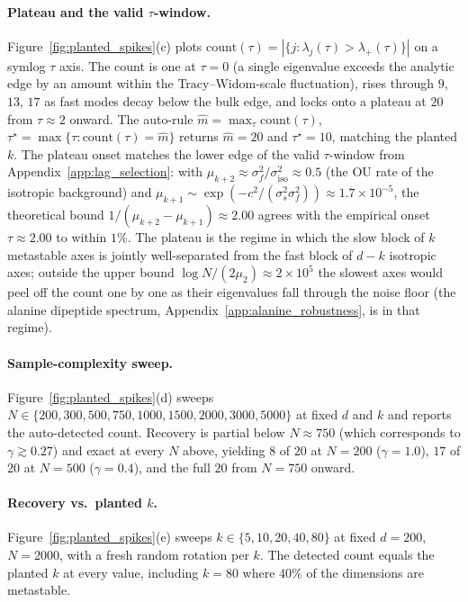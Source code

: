 \documentclass{article}
\begin{document}
\paragraph{Plateau and the valid $\tau$-window.}
Figure~\ref{fig:planted_spikes}(c) plots $\mathrm{count}(\tau) = |\{j: \lambda_j(\tau) > \lambda_+(\tau)\}|$ on a symlog $\tau$ axis. The count is one at $\tau = 0$ (a single eigenvalue exceeds the analytic edge by an amount within the Tracy--Widom-scale fluctuation), rises through $9$, $13$, $17$ as fast modes decay below the bulk edge, and locks onto a plateau at $20$ from $\tau \approx 2$ onward. The auto-rule $\hat m = \max_\tau \mathrm{count}(\tau)$, $\tau^\star = \max\{\tau : \mathrm{count}(\tau) = \hat m\}$ returns $\hat m = 20$ and $\tau^\star = 10$, matching the planted $k$. The plateau onset matches the lower edge of the valid $\tau$-window from Appendix~\ref{app:lag_selection}: with $\mu_{k+2} \approx \sigma_f^2/\sigma_{\mathrm{iso}}^2 \approx 0.5$ (the OU rate of the isotropic background) and $\mu_{k+1} \sim \exp(-c^2/(\sigma_s^2 \sigma_f^2)) \approx 1.7 \times 10^{-5}$, the theoretical bound $1/(\mu_{k+2} - \mu_{k+1}) \approx 2.00$ agrees with the empirical onset $\tau \approx 2.00$ to within $1\%$. The plateau is the regime in which the slow block of $k$ metastable axes is jointly well-separated from the fast block of $d-k$ isotropic axes; outside the upper bound $\log N / (2 \mu_2) \approx 2 \times 10^5$ the slowest axes would peel off the count one by one as their eigenvalues fall through the noise floor (the alanine dipeptide spectrum, Appendix~\ref{app:alanine_robustness}, is in that regime).

\paragraph{Sample-complexity sweep.}
Figure~\ref{fig:planted_spikes}(d) sweeps $N \in \{200, 300, 500, 750, 1000, 1500, 2000, 3000, 5000\}$ at fixed $d$ and $k$ and reports the auto-detected count. Recovery is partial below $N \approx 750$ (which corresponds to $\gamma \gtrsim 0.27$) and exact at every $N$ above, yielding $8$ of $20$ at $N = 200$ ($\gamma = 1.0$), $17$ of $20$ at $N = 500$ ($\gamma = 0.4$), and the full $20$ from $N = 750$ onward.

\paragraph{Recovery vs.\ planted $k$.}
Figure~\ref{fig:planted_spikes}(e) sweeps $k \in \{5, 10, 20, 40, 80\}$ at fixed $d = 200$, $N = 2000$, with a fresh random rotation per $k$. The detected count equals the planted $k$ at every value, including $k = 80$ where $40\%$ of the dimensions are metastable.
\end{document}
